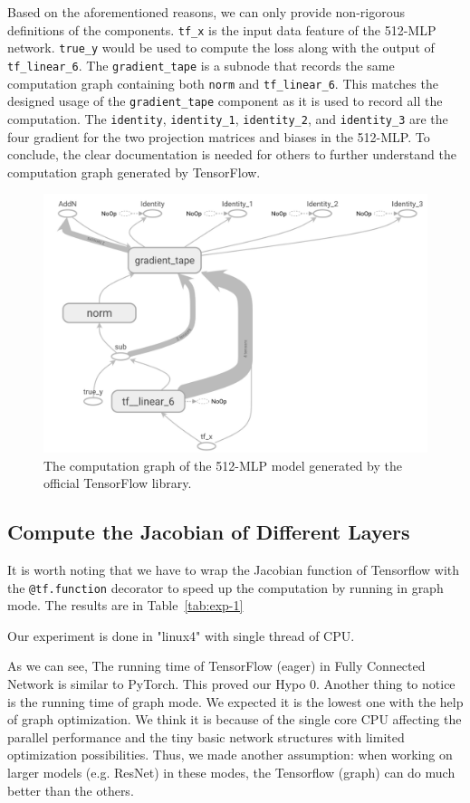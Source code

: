 \documentclass[12pt,twocolumn,letterpaper]{extarticle}
\begin{document}
Based on the aforementioned reasons, we can only provide non-rigorous definitions of the components. \texttt{tf\_x} is the input data feature of the 512-MLP network. \texttt{true\_y} would be used to compute the loss along with the output of \texttt{tf\_linear\_6}. The \texttt{gradient\_tape} is a subnode that records the same computation graph containing both \texttt{norm} and \texttt{tf\_linear\_6}. This matches the designed usage of the \texttt{gradient\_tape} component as it is used to record all the computation. The \texttt{identity}, \texttt{identity\_1}, \texttt{identity\_2}, and \texttt{identity\_3} are the four gradient for the two projection matrices and biases in the 512-MLP. To conclude, the clear documentation is needed for others to further understand the computation graph generated by TensorFlow.

\begin{figure}[ht]
    \centering
    \includegraphics[width=0.8\columnwidth]{images/tf-computation-graph.png}
    \caption{The computation graph of the 512-MLP model generated by the official TensorFlow library.}
    \label{fig:pt-computation-graph}
\end{figure}

\subsection{Compute the Jacobian of Different Layers} \label{exp-2}

It is worth noting that we have to wrap the Jacobian function of Tensorflow with the \texttt{@tf.function} decorator to speed up the computation by running in graph mode. The results are in Table~\ref{tab:exp-1}

Our experiment is done in "linux4" with single thread of CPU.

As we can see, The running time of TensorFlow (eager) in Fully Connected Network is similar to PyTorch. This proved our Hypo 0.
Another thing to notice is the running time of graph mode. We expected it is the lowest one with the help of graph optimization. We think it is because of the single core CPU affecting the parallel performance and the tiny basic network structures with limited optimization possibilities. Thus, we made another assumption: when working on larger models (e.g. ResNet) in these modes, the Tensorflow (graph) can do much better than the others. 
\end{document}
